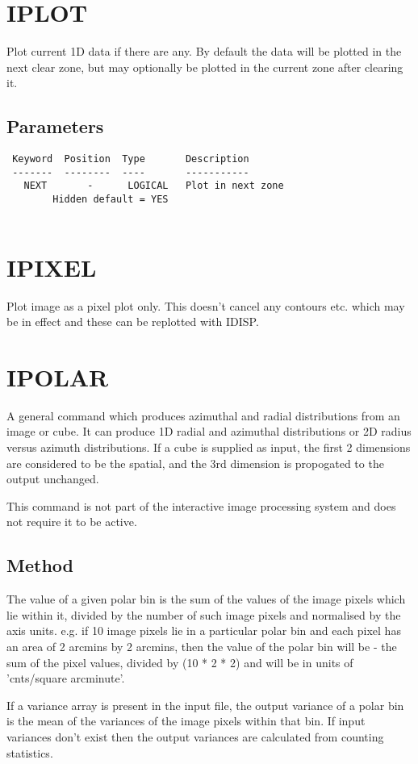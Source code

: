 \documentclass{book}
\renewcommand{\_}{{\tt\char'137}}     %
\begin{document}
\section{IPLOT}
Plot current 1D data if there are any. By default the data will be
plotted in the next clear zone, but may optionally be plotted in the
current zone after clearing it.
 
\subsection{Parameters}
\begin{verbatim}
 Keyword  Position  Type       Description
 -------  --------  ----       -----------
   NEXT       -      LOGICAL   Plot in next zone
        Hidden default = YES
 
\end{verbatim}\section{IPIXEL}
Plot image as a pixel plot only. This doesn't cancel any contours
etc. which may be in effect and these can be replotted with IDISP.
 
\section{IPOLAR}
A general command which produces azimuthal and radial distributions
from an image or cube. It can produce 1D radial and azimuthal
distributions or 2D radius versus azimuth distributions. If a cube
is supplied as input, the first 2 dimensions are considered to be
the spatial, and the 3rd dimension is propogated to the output
unchanged.
 
This command is not part of the interactive image processing system
and does not require it to be active.
 
\subsection{Method}
The value of a given polar bin is the sum of the values of the image
pixels which lie within it, divided by the number of such image pixels
and normalised by the axis units. e.g. if 10 image pixels lie in a
particular polar bin and each pixel has an area of 2 arcmins by 2 arcmins,
then the value of the polar bin will be - the sum of the pixel values,
divided by (10 * 2 * 2) and will be in units of 'cnts/square
arcminute'.
 
If a variance array is present in the input file, the output
variance of a polar bin is the mean of the variances of the image pixels
within that bin. If input variances don't exist then the output
variances are calculated from counting statistics.
 
\end{document}
